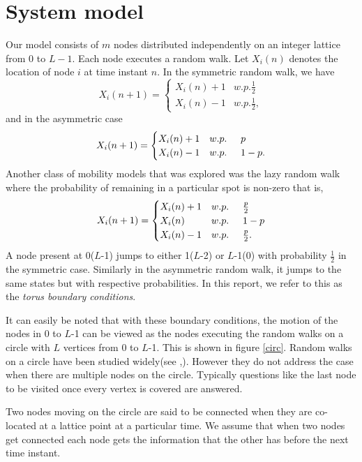\documentclass[a4paper,10pt,english]{article}
\begin{document}
\section{System model}\label{model}
Our model consists of $m$ nodes distributed independently on an integer lattice from 0 to $L-1$. Each node executes a random walk. Let $X_i(n)$ denotes the location of node $i$ at time instant $n$. In the symmetric random walk, we have 
\begin{equation}
X_i(n+1)=
\begin{cases}
X_i(n)+1 &w.p. \frac{1}{2}\\
X_i(n)-1 &w.p. \frac{1}{2},
\end{cases}
\end{equation}
and in the asymmetric case 
\begin{equation}
X_i(n+1)=
\begin{cases}
X_i(n)+1 &w.p.\hspace{.5cm} p\\
X_i(n)-1 &w.p.\hspace{.5cm} 1-p.
\end{cases}
\end{equation}
Another class of mobility models that was explored was the lazy random walk where the probability of remaining in a particular spot is non-zero that is,
\begin{equation}
X_i(n+1)=
\begin{cases}
X_i(n)+1 &w.p.\hspace{.5cm} \frac{p}{2}\\
X_i(n)   &w.p.\hspace{.5cm} 1-p\\
X_i(n)-1 &w.p.\hspace{.5cm} \frac{p}{2}.
\end{cases}
\end{equation}
A node present at 0($L$-1) jumps to either 1($L$-2) or $L$-1(0) with probability $\frac{1}{2}$ in the symmetric case. Similarly in the asymmetric random walk, it jumps to the same states but with respective probabilities. In this report, we refer to this as the \textit{torus boundary conditions}.
\par It can easily be noted that with these boundary conditions, the motion of the nodes in 0 to $L$-1 can be viewed as the nodes executing the random walks on a circle with $L$ vertices from 0 to $L$-1. This is shown in figure \ref{circ}. Random walks on a circle have been studied widely(see \cite{circle2},\cite{diaconis}). However they do not address the case when there are multiple nodes on the circle. Typically questions like the last node to be visited once every vertex is covered are answered.
\par Two nodes moving on the circle are said to be connected when they are co-located at a lattice point at a particular time. We assume that when two nodes get connected each node gets the information that the other has before the next time instant.
\end{document}

